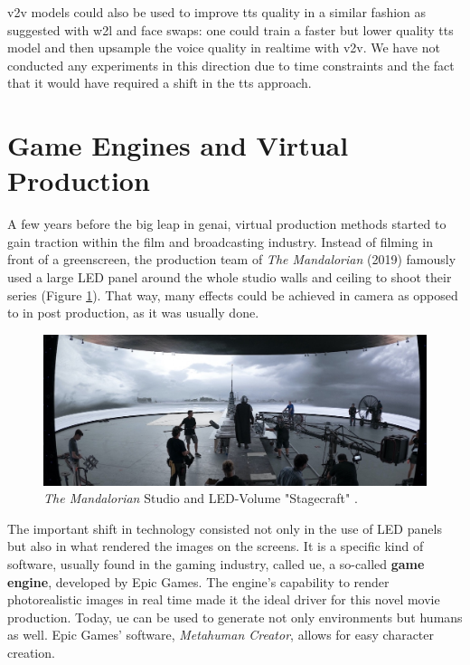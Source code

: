 \documentclass[
  a4paper,  %
  twoside,  %
  bibliography=totoc,
  headsepline,
  cleardoublepage=empty,
  parskip=half,
  draft=false
]{scrbook}
\begin{document}
\gls{v2v} models could also be used to improve \gls{tts} quality in a similar fashion as suggested with \gls{w2l} and face swaps: one could train a faster but lower quality \gls{tts} model and then upsample the voice quality in realtime with \gls{v2v}. We have not conducted any experiments in this direction due to time constraints and the fact that it would have required a shift in the \gls{tts} approach.

\section{Game Engines and Virtual Production}
\label{sec:bg-virtual-production}
A few years before the big leap in \gls{genai}, virtual production methods started to gain traction within the film and broadcasting industry. Instead of filming in front of a greenscreen, the production team of \textit{The Mandalorian} (2019) famously used a large LED panel around the whole studio walls and ceiling to shoot their series (Figure \ref{fig:mando-vps}). That way, many effects could be achieved in camera as opposed to in post production, as it was usually done.

\begin{figure}[h]
  \centering
  \includegraphics[width=1\textwidth]{./graphics/mandalorian-vp.jpg}
  \caption{\textit{The Mandalorian} Studio and LED-Volume "Stagecraft" \cite{landsiedelGamechanger2021}.}
  \label{fig:mando-vps}
\end{figure}

The important shift in technology consisted not only in the use of LED panels but also in what rendered the images on the screens. It is a specific kind of software, usually found in the gaming industry, called \gls{ue}, a so-called \textbf{game engine}, developed by Epic Games. The engine's capability to render photorealistic images in real time made it the ideal driver for this novel movie production. Today, \gls{ue} can be used to generate not only environments but humans as well. Epic Games' software, \textit{Metahuman Creator}, allows for easy character creation. 
\end{document}

